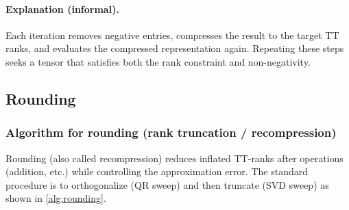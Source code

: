 \documentclass[11pt,a4paper,parskip=half-]{scrartcl}
\theoremstyle{definition}
\theoremstyle{plain}
\theoremstyle{remark}
\begin{document}
\paragraph{Explanation (informal).}
Each iteration removes negative entries, compresses the result to the target TT
ranks, and evaluates the compressed representation again. Repeating these
steps seeks a tensor that satisfies both the rank constraint and
non-negativity.

\subsection{Rounding}

\subsubsection{Algorithm for rounding (rank truncation / recompression)}

Rounding (also called recompression) reduces inflated TT-ranks after operations
(addition, etc.) while controlling the approximation error. The standard
procedure is to orthogonalize (QR sweep) and then truncate (SVD sweep)
\cite{Oseledets2011TT} as shown in \cref{alg:rounding}.
\end{document}
